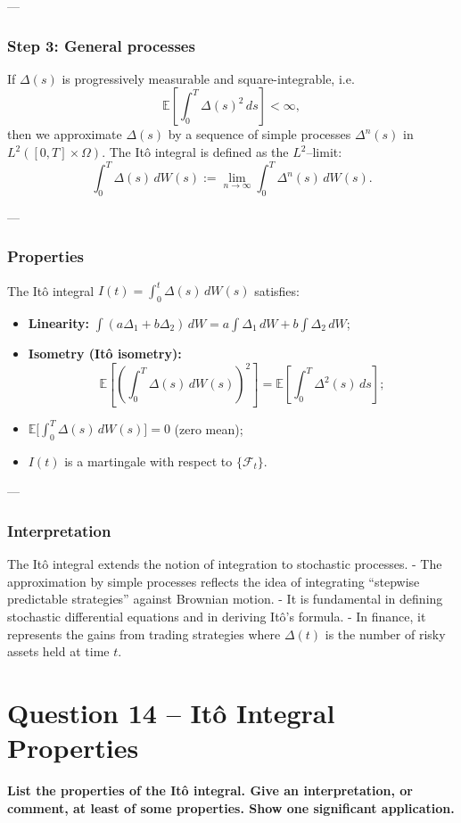 \documentclass[12pt,a4paper]{book}
\theoremstyle{remark}
\newcommand{\EE}{\mathbb{E}}          %
\newcommand{\F}{\mathcal{F}}          %
\begin{document}
---

\subsubsection*{Step 3: General processes}
If $\Delta(s)$ is progressively measurable and square-integrable, i.e.
\[
\EE\!\left[\int_0^T \Delta(s)^2 \,ds\right] < \infty,
\]
then we approximate $\Delta(s)$ by a sequence of simple processes $\Delta^n(s)$ in $L^2([0,T]\times\Omega)$.  
The Itô integral is defined as the $L^2$–limit:
\[
\int_0^T \Delta(s)\,dW(s) := \lim_{n\to\infty} \int_0^T \Delta^n(s)\,dW(s).
\]

---

\subsubsection*{Properties}
The Itô integral $I(t)=\int_0^t \Delta(s)\,dW(s)$ satisfies:
\begin{itemize}
    \item \textbf{Linearity:} $\int (a\Delta_1+b\Delta_2)\,dW = a\int\Delta_1\,dW + b\int\Delta_2\,dW$;
    \item \textbf{Isometry (Itô isometry):}
    \[
    \EE\!\left[\left(\int_0^T \Delta(s)\,dW(s)\right)^2\right] = \EE\!\left[\int_0^T \Delta^2(s)\,ds\right];
    \]
    \item $\EE\!\big[\int_0^T \Delta(s)\,dW(s)\big] = 0$ (zero mean);
    \item $I(t)$ is a martingale with respect to $\{\F_t\}$.
\end{itemize}

---

\subsubsection*{Interpretation}
The Itô integral extends the notion of integration to stochastic processes.  
- The approximation by simple processes reflects the idea of integrating “stepwise predictable strategies” against Brownian motion.  
- It is fundamental in defining stochastic differential equations and in deriving Itô’s formula.  
- In finance, it represents the gains from trading strategies where $\Delta(t)$ is the number of risky assets held at time $t$.







\newpage
\section{Question 14 -- Itô Integral Properties}
\textbf{List the properties of the It\^o integral. Give an interpretation, or comment, at least of some properties. Show one significant application.}
\end{document}
